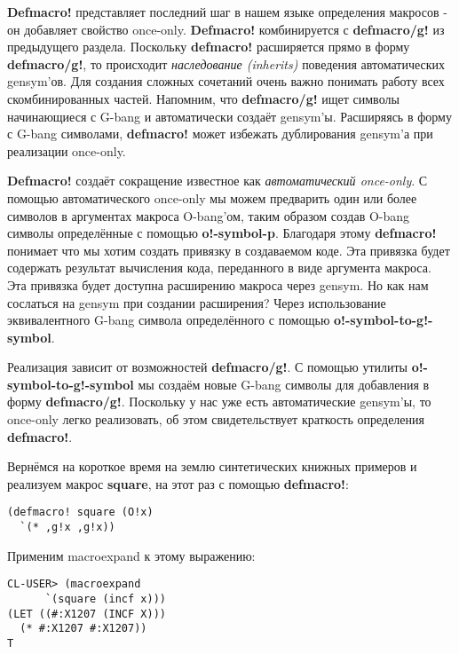 \textbf{Defmacro!} представляет последний шаг в нашем языке определения макросов - он добавляет свойство once-only. \textbf{Defmacro!} комбинируется с \textbf{defmacro/g!} из предыдущего раздела. Поскольку \textbf{defmacro!} расширяется прямо в форму \textbf{defmacro/g!}, то происходит \emph{наследование (inherits)} поведения автоматических gensym'ов. Для создания сложных сочетаний очень важно понимать работу всех скомбинированных частей. Напомним, что \textbf{defmacro/g!} ищет символы начинающиеся с G-bang и автоматически создаёт gensym'ы. Расширяясь в форму с G-bang символами, \textbf{defmacro!} может избежать дублирования gensym'а при реализации once-only.

\textbf{Defmacro!} создаёт сокращение известное как \emph{автоматический once-only}. С помощью автоматического once-only мы можем предварить один или более символов в аргументах макроса O-bang'ом, таким образом создав O-bang символы определённые с помощью \textbf{o!-symbol-p}. Благодаря этому \textbf{defmacro!} понимает что мы хотим создать привязку в создаваемом коде. Эта привязка будет содержать результат вычисления кода, переданного в виде аргумента макроса. Эта привязка будет доступна расширению макроса через gensym. Но как нам сослаться на gensym при создании расширения? Через использование эквивалентного G-bang символа определённого с помощью \textbf{o!-symbol-to-g!-symbol}.

Реализация зависит от возможностей \textbf{defmacro/g!}. С помощью утилиты \textbf{o!-symbol-to-g!-symbol} мы создаём новые G-bang символы для добавления в форму \textbf{defmacro/g!}. Поскольку у нас уже есть автоматические gensym'ы, то once-only легко реализовать, об этом свидетельствует краткость определения \textbf{defmacro!}.

Вернёмся на короткое время на землю синтетических книжных примеров и реализуем макрос \textbf{square}, на этот раз с помощью \textbf{defmacro!}:

\begin{verbatim}
(defmacro! square (O!x)
  `(* ,g!x ,g!x))
\end{verbatim}

Применим macroexpand к этому выражению:

\begin{verbatim}
CL-USER> (macroexpand
	  `(square (incf x)))
(LET ((#:X1207 (INCF X)))
  (* #:X1207 #:X1207))
T
\end{verbatim}

